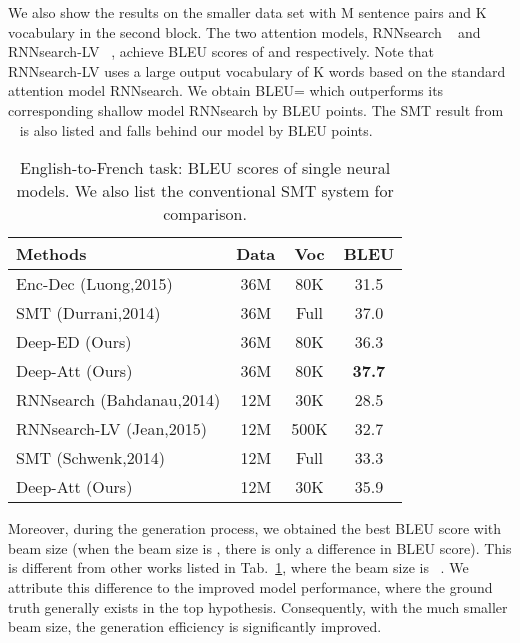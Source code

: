 \documentclass[11pt,letterpaper]{article}
\begin{document}
We also show the results on the smaller data set with M sentence pairs and K vocabulary in the second block. The two attention models,
RNNsearch ~\cite{Bahdanau-Bengio-ICLR2015} and RNNsearch-LV ~\cite{Jean-Bengio-ACL2015}, achieve BLEU scores of  and 
respectively. Note that RNNsearch-LV uses a large output vocabulary of K words based on the standard attention model RNNsearch.  We
obtain  BLEU=  which outperforms its corresponding shallow model RNNsearch by  BLEU points. The SMT result from
~\cite{Schwenk-2014} is also listed and falls behind our model by  BLEU points.

\begin{table}[!ht]
\footnotesize
\begin{center}
\begin{tabular}{|l|c|c|c|}
\hline
  Methods &  Data  & Voc & BLEU \\
  \hline
  \hline
  Enc-Dec (Luong,2015)  & 36M & 80K & 31.5 \\
  \hline
  SMT (Durrani,2014)    &  36M & Full & 37.0 \\
  \hline
  Deep-ED (Ours)    & 36M & 80K & 36.3 \\
  Deep-Att (Ours)  & 36M & 80K & \textbf{37.7} \\
  \hline
  \hline
  RNNsearch (Bahdanau,2014)  & 12M & 30K & 28.5 \\
  RNNsearch-LV (Jean,2015)  & 12M & 500K & 32.7 \\
  \hline
  SMT (Schwenk,2014) & 12M & Full & 33.3 \\
  \hline
  Deep-Att (Ours)  & 12M & 30K & 35.9  \\
  \hline
\end{tabular}
\end{center}
\caption{\label{tab:Results-BLEU-Single} English-to-French task: BLEU scores of single neural models. We also list the conventional SMT system
for comparison. }
\end{table}


Moreover, during the generation process, we obtained the best BLEU score with beam size  (when the beam size is , there is only a 
difference in BLEU score). This is different from other \mbox{works} listed in Tab.~\ref{tab:Results-BLEU-Single}, where the beam size is 
~\cite{Jean-Bengio-ACL2015,Sutskever-Le-NIPS2014}. We attribute this \mbox{difference} to the improved model performance, where the ground
truth generally exists in the top hypothesis. Consequently, with the much smaller  beam size, the generation efficiency is significantly
improved.
\end{document}
